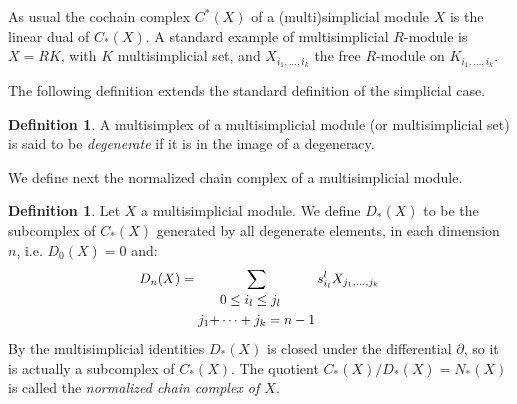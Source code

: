 \documentclass[a4paper,11pt]{article}
\theoremstyle{remark}
\theoremstyle{definition}
\newtheorem{definition}[theorem]{Definition}
\begin{document}
As usual the cochain complex $C^*(X)$ of a (multi)simplicial module $X$ is the linear dual of $C_*(X)$.  
A standard example of multisimplicial $R$-module is $X=RK$, with $K$ multisimplicial set, and $X_{i_1,\dots,i_k}$ the free $R$-module
on $K_{i_1,\dots,i_k}$.

The following definition extends the standard definition of the simplicial case.
\begin{definition}
A multisimplex of a multisimplicial module (or multisimplicial set)  is said to be {\em degenerate} if it is in the image of a degeneracy.
\end{definition}





We define next the normalized chain complex of a multisimplicial module.

\begin{definition}
Let $X$ a multisimplicial module. We define $D_{*}(X)$ to be the subcomplex of $C_{*}(X)$ generated by all degenerate elements, in each dimension $n$, i.e. $D_{0}(X)=0$ and:
	\begin{equation*}
	\resizebox{0.5\hsize}{!}{$%
	\begin{split}
    D_{n}(X)= 
    \sum_{\begin{split}
    	& 0 \leq i_l \leq j_l \\
    	j_{1}+&\dots +j_{k}=n-1 \\
    	\end{split}} 
    s_{i_l}^{l}X_{j_{1},\dots,j_{k}} \\
	\end{split}
    $%
    }%
	\end{equation*}
By the multisimplicial identities $D_{*}(X)$ is closed under the differential $\partial$, so it is actually a subcomplex of $C_*(X)$.
 The quotient $C_{*}(X)/ D_{*}(X) = N_*(X)$  is called the \textit{normalized chain complex of $X$}.
\end{definition}
\end{document}
